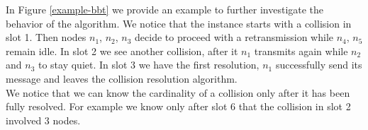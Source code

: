 \documentclass[11pt,a4paper,twoside,openright]{book}
\begin{document}
In Figure \ref{example-bbt} we provide an example to further investigate the behavior of the algorithm. We notice that the instance starts with a collision in slot 1. Then nodes $n_{1}$, $n_{2}$, $n_{3}$ decide to proceed with a retransmission while $n_{4}$, $n_{5}$ remain idle. In slot 2 we see another collision, after it $n_{1}$ transmits again while $n_{2}$ and $ n_{3}$ to stay quiet. In slot 3 we have the first resolution, $n_{1}$ successfully send its message and leaves the collision resolution algorithm.\\
We notice that we can know the cardinality of a collision only after it has been fully  resolved. For example we know only after slot 6 that the collision in slot 2 involved 3 nodes.\\

\end{document}
